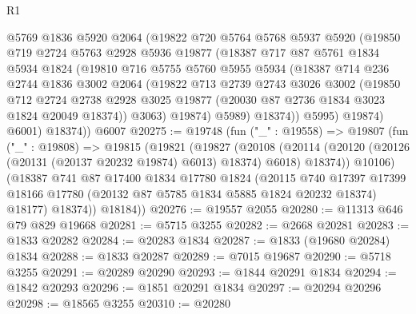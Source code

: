 \begin{lexlean}{R1}
\begin{coremodule}
            @5769
            @1836
            @5920
            @2064
            (@19822
              @720
              @5764
              @5768
              @5937
              @5920
              (@19850
                @719
                @2724
                @5763
                @2928
                @5936
                @19877
                (@18387
                  @717
                  @87
                  @5761
                  @1834
                  @5934
                  @1824
                  (@19810
                    @716
                    @5755
                    @5760
                    @5955
                    @5934
                    (@18387
                      @714
                      @236
                      @2744
                      @1836
                      @3002
                      @2064
                      (@19822
                        @713
                        @2739
                        @2743
                        @3026
                        @3002
                        (@19850
                          @712
                          @2724
                          @2738
                          @2928
                          @3025
                          @19877
                          (@20030 @87 @2736 @1834 @3023 @1824 @20049 @18374))
                        @3063)
                      @19874)
                    @5989)
                  @18374))
              @5995)
            @19874)
          @6001)
        @18374))
    @6007
@20275 := @19748
    (fun ("_" : @19558) =>
    @19807
      (fun ("_" : @19808) =>
      @19815
        (@19821
          (@19827
            (@20108
              (@20114 (@20120 (@20126 (@20131 (@20137 @20232 @19874) @6013) @18374) @6018) @18374))
            @10106)
          (@18387
            @741
            @87
            @17400
            @1834
            @17780
            @1824
            (@20115
              @740
              @17397
              @17399
              @18166
              @17780
              (@20132 @87 @5785 @1834 @5885 @1824 @20232 @18374)
              @18177)
            @18374))
        @18184))
@20276 := @19557 @2055
@20280 := @11313 @646 @79 @829 @19668
@20281 := @5715 @3255
@20282 := @2668 @20281
@20283 := @1833 @20282
@20284 := @20283 @1834
@20287 := @1833 (@19680 @20284) @1834
@20288 := @1833 @20287
@20289 := @7015 @19687
@20290 := @5718 @3255
@20291 := @20289 @20290
@20293 := @1844 @20291 @1834
@20294 := @1842 @20293
@20296 := @1851 @20291 @1834
@20297 := @20294 @20296
@20298 := @18565 @3255
@20310 := @20280

\end{coremodule}
\end{lexlean}
